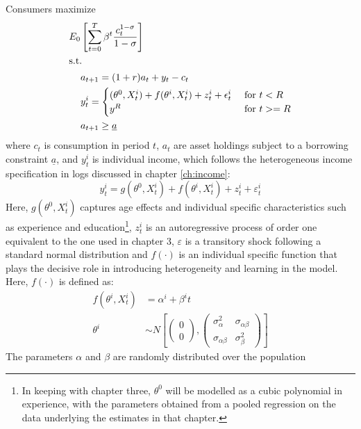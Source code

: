 Consumers maximize
\begin{align}
E_0 &\left[ \sum_{t=0}^{T} \beta^{t} \frac{c_{t}^{1-\sigma}}{1-\sigma} \right] \label{eq:maxprob} \\
\intertext{s.t. } &a_{t+1} = (1+r)a_t + y_t - c_t \label{eq:bc} \\
				  &y_{t}^i = \begin{cases} (\theta^0, X_t^i) + f(\theta^i, X_t^i) + z_t^i + \epsilon_t^i \label{eq:incproc} &  \text{ for } t<R \\
                                           y^R & \text{ for } t>= R
                             \end{cases} \\
  				  &a_{t+1} \geq \underline{a} \label{eq:borrcons} 
\end{align}
where $c_t$ is consumption in period $t$, $a_t$ are asset holdings subject to 
a borrowing constraint  $\underline{a}$, and $y_t^i$ is individual 
income, which follows the heterogeneous income specification in logs discussed
in chapter \ref{ch:income}: 
\begin{equation*}
y_{t}^i = g(\theta^0, X_t^i) + f(\theta^i, X_t^i) + z_t^i + \varepsilon_t^i 
\end{equation*}
Here, $g(\theta^0, X_t^i)$ captures age effects and individual specific 
characteristics such as experience and education\footnote{In keeping with chapter three, 
$\theta^0$ will be modelled as a cubic polynomial in experience, with the parameters
obtained from a pooled regression on the data underlying the estimates in that 
chapter.}, $z_t^i$ is an autoregressive process of order one equivalent to 
the one used in chapter 3, $\varepsilon$ is a transitory shock following a standard normal 
distribution and $f(\cdot)$ is an individual specific function that plays the decisive
role in introducing heterogeneity and learning in the model. Here, $f(\cdot)$ 
is defined as:
\begin{align*}
f(\theta^i, X_t^i) &= \alpha^i + \beta^i t \\
\theta^i &\sim N \left[ \begin{pmatrix} 0 \\ 0 \end{pmatrix}, \begin{pmatrix} \sigma_{\alpha}^2 & \sigma_{\alpha \beta} \\ \sigma_{\alpha \beta} & \sigma_{\beta}^2 \end{pmatrix} \right]
\end{align*}
The parameters $\alpha$ and $\beta$ are randomly distributed over the population 

